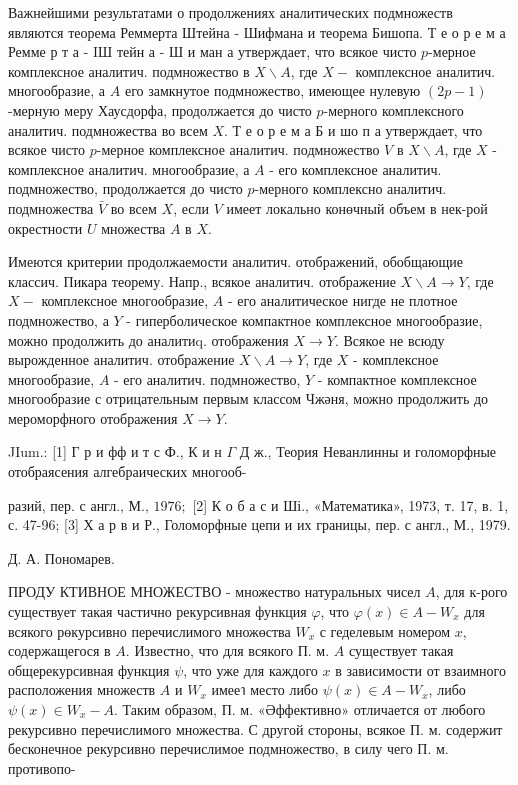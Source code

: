 \documentclass[10pt]{article}
\begin{document}
Важнейшими результатами о продолжениях аналитических подмножеств являются теорема Реммерта Штейна - Шифмана и теорема Бишопа. Т е о р е м а Ремме р т а - IШ тейн а - Ш и ман а утверждает, что всякое чисто $p$-мерное комплексное аналитич. подмножество в $X \backslash A$, где $X-$ комплексное аналитич. многообразие, а $A$ его замкнутое подмножество, имеющее нулевую $(2 p-1)$-мерную меру Хаусдорфа, продолжается до чисто $p$-мерного комплексного аналитич. подмножества во всем $X$. Т е о р е м а Б и шо п а утверждает, что всякое чисто $p$-мерное комплексное аналитич. подмножество $V$ в $X \backslash A$, где $X$ - комплексное аналитич. многообразие, а $A$ - его комплексное аналитич. подмножество, продолжается до чисто $p$-мерного комплексно аналитич. подмножества $\bar{V}$ во всем $X$, если $V$ имеет локально конөчный объем в нек-рой окрестности $U$ множества $A$ в $X$.



Имеются критерии продолжаемости аналитич. отображений, обобщающие классич. Пикара теорему. Напр., всякое аналитич. отображение $X \backslash A \rightarrow Y$, где $X-$ комплексное многообразие, $A$ - его аналитическое нигде не плотное подмножество, а $Y$ - гиперболическое компактное комплексное многообразие, можно продолжить до аналитиq. отображения $X \rightarrow Y$. Всякое не всюду вырожденное аналитич. отображение $X \backslash A \rightarrow Y$, где $X$ - комплексное многообразие, $A$ - его аналитич. подмножество, $Y$ - компактное комплексное многообразие с отрицательным первым классом Чжәня, можно продолжить до мероморфного отображения $X \rightarrow Y$.



JIum.: [1] Г р и фф и т с Ф., К и н $\Gamma$ Д ж., Теория Неванлинны и голоморфные отобраясения алгебраических многооб-

разий, пер. с англ., М., $1976 ;$ [2] К о б а с и Ші., «Математика», 1973, т. 17, в. 1, с. 47-96; [3] Х а р в и Р., Голоморфные цепи и их границы, пер. с англ., М., 1979.



Д. А. Пономарев.



ПРОДУ КТИВНОЕ МНОЖЕСТВО - множество натуральных чисел $A$, для к-рого существует такая частично рекурсивная функция $\varphi$, что $\varphi(x) \in A-W_{x}$ для всякого рөкурсивно перечислимого множөства $W_{x}$ с геделевым номером $x$, содержащегося в $A$. Известно, что для всякого П. м. $A$ существует такая общерекурсивная функция $\psi$, что уже для каждого $x$ в зависимости от взаимного расположения множеств $A$ и $W_{x}$ имееา место либо $\psi(x) \in A-W_{x}$, либо $\psi(x) \in W_{x}-A$. Таким образом, П. м. «Әффективно» отличается от любого рекурсивно перечислимого множества. С другой стороны, всякое П. м. содержит бесконечное рекурсивно перечислимое подмножество, в силу чего П. м. противопо-
\end{document}
